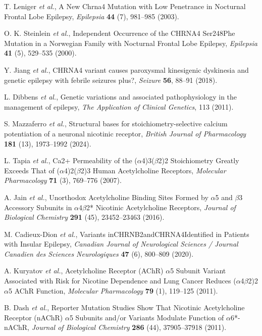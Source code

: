 T. Leniger {\em et al.}, A New Chrna4 Mutation with Low Penetrance in Nocturnal Frontal Lobe Epilepsy, {\em Epilepsia} {\bf 44} (7), 981--985 (2003).

O. K. Steinlein {\em et al.}, Independent Occurrence of the CHRNA4 Ser248Phe Mutation in a Norwegian Family with Nocturnal Frontal Lobe Epilepsy, {\em Epilepsia} {\bf 41} (5), 529--535 (2000).

Y. Jiang {\em et al.}, CHRNA4 variant causes paroxysmal kinesigenic dyskinesia and genetic epilepsy with febrile seizures plus?, {\em Seizure} {\bf 56}, 88--91 (2018).

L. Dibbens {\em et al.}, Genetic variations and associated pathophysiology in the management of epilepsy, {\em The Application of Clinical Genetics}, 113 (2011).

S. Mazzaferro {\em et al.}, Structural bases for stoichiometry-selective calcium potentiation of a neuronal nicotinic receptor, {\em British Journal of Pharmacology} {\bf 181} (13), 1973--1992 (2024).

L. Tapia {\em et al.}, Ca2+ Permeability of the ($\alpha$4)3($\beta$2)2 Stoichiometry Greatly Exceeds That of ($\alpha$4)2($\beta$2)3 Human Acetylcholine Receptors, {\em Molecular Pharmacology} {\bf 71} (3), 769--776 (2007).

A. Jain {\em et al.}, Unorthodox Acetylcholine Binding Sites Formed by $\alpha$5 and $\beta$3 Accessory Subunits in $\alpha$4$\beta$2* Nicotinic Acetylcholine Receptors, {\em Journal of Biological Chemistry} {\bf 291} (45), 23452--23463 (2016).

M. Cadieux-Dion {\em et al.}, Variants inCHRNB2andCHRNA4Identified in Patients with Insular Epilepsy, {\em Canadian Journal of Neurological Sciences / Journal Canadien des Sciences Neurologiques} {\bf 47} (6), 800--809 (2020).

A. Kuryatov {\em et al.}, Acetylcholine Receptor (AChR) $\alpha$5 Subunit Variant Associated with Risk for Nicotine Dependence and Lung Cancer Reduces ($\alpha$4$\beta$2)2$\alpha$5 AChR Function, {\em Molecular Pharmacology} {\bf 79} (1), 119--125 (2011).

B. Dash {\em et al.}, Reporter Mutation Studies Show That Nicotinic Acetylcholine Receptor (nAChR) $\alpha$5 Subunits and/or Variants Modulate Function of $\alpha$6*-nAChR, {\em Journal of Biological Chemistry} {\bf 286} (44), 37905--37918 (2011).

